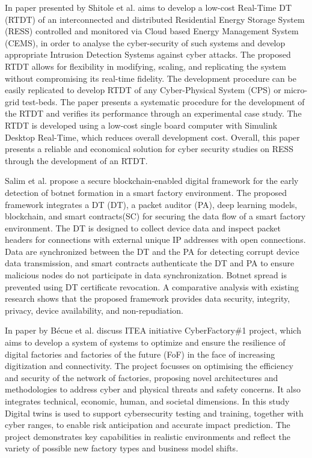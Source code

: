  In\cite{shitoleRealTimeDigitalTwin2021} paper presented by Shitole et al. aims to develop a low-cost Real-Time DT (RTDT) of an interconnected and distributed Residential Energy Storage System (RESS) controlled and monitored via Cloud based Energy Management System (CEMS), in order to analyse the cyber-security of such systems and develop appropriate Intrusion Detection Systems against cyber attacks. The proposed RTDT allows for flexibility in modifying, scaling, and replicating the system without compromising its real-time fidelity. The development procedure can be easily replicated to develop RTDT of any Cyber-Physical System (CPS) or micro-grid test-beds. The paper presents a systematic procedure for the development of the RTDT and verifies its performance through an experimental case study. The RTDT is developed using a low-cost single board computer with Simulink Desktop Real-Time, which reduces overall development cost. Overall, this paper presents a reliable and economical solution for cyber security studies on RESS through the development of an RTDT.


 Salim et al.\cite{salimBlockchainEnabledSecureDigital2022} propose a secure blockchain-enabled digital framework for the early detection of botnet formation in a smart factory environment. The proposed framework integrates a DT (DT), a packet auditor (PA), deep learning models, blockchain, and smart contracts(SC) for securing the data flow of a smart factory environment. The DT is designed to collect device data and inspect packet headers for connections with external unique IP addresses with open connections. Data are synchronized between the DT and the PA for detecting corrupt device data transmission, and smart contracts authenticate the DT and PA to ensure malicious nodes do not participate in data synchronization. Botnet spread is prevented using DT certificate revocation. A comparative analysis with existing research shows that the proposed framework provides data security, integrity, privacy, device availability, and non-repudiation.


In \cite{becueCyberFactorySecuringIndustry40with2018} paper by Bécue et al. discuss ITEA initiative CyberFactory\#1 project, which aims to develop a system of systems to optimize and ensure the resilience of digital factories and factories of the future (FoF) in the face of increasing digitization and connectivity. The project focusses on optimising the efficiency and security of the network of factories, proposing novel architectures and methodologies to address cyber and physical threats and safety concerns. It also integrates technical, economic, human, and societal dimensions. In this study Digital twins is used to support cybersecurity testing and training, together with cyber ranges, to enable risk anticipation and accurate impact prediction. The project demonstrates key capabilities in realistic environments and reflect the variety of possible new factory types and business model shifts.



